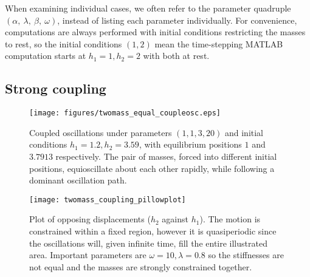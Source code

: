 \documentclass{article}
\begin{document}
When examining individual cases, we often refer to the parameter quadruple \((\alpha,~\lambda,~\beta,~\omega)\), instead of listing each parameter individually.
For convenience, computations are always performed with initial conditions restricting the masses to rest,
so the initial conditions \((1,2)\) mean the time-stepping MATLAB computation starts at $h_1=1,h_2=2$ with both at rest.

\subsection{Strong coupling}

\begin{figure}
    \centering
    \texttt{[image: figures/twomass\_equal\_coupleosc.eps]}
    \caption{Coupled oscillations under parameters \((1, 1, 3, 20)\) and initial conditions \(h_1 = 1.2, h_2 = 3.59\),
    with equilibrium positions \(1\) and \(3.7913\) respectively. The pair of masses, forced into different initial positions,
    equioscillate about each other rapidly, while following a dominant oscillation path.}
    \label{fig:twomass_dominant_osc}
\end{figure}
\begin{figure}
    \centering
    \texttt{[image: twomass\_coupling\_pillowplot]}
    \caption{
        Plot of opposing displacements ($h_2$ against $h_1$). The motion is constrained within a fixed region,
        however it is quasiperiodic since the oscillations will, given infinite time, fill the entire illustrated area.
        Important parameters are \(\omega = 10, \lambda = 0.8\) so the stiffnesses are not equal and the masses are strongly constrained together.
    }
    \label{fig:twomass_quasiperiodic}
\end{figure} %
\end{document}
